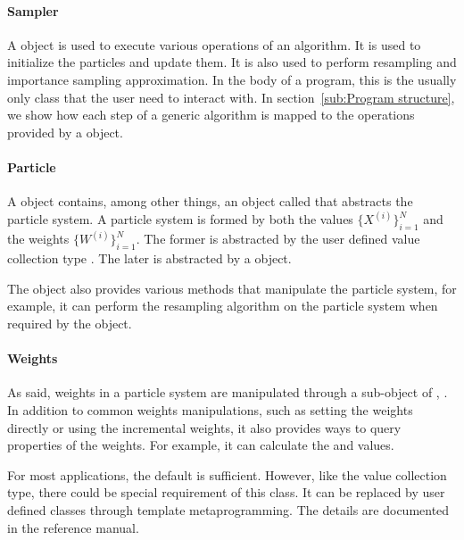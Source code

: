 \paragraph{Sampler}

A  object is used to execute various operations of an
\smc algorithm. It is used to initialize the particles and update them. It is
also used to perform resampling and importance sampling approximation. In the
body of a program, this is the usually only class that the user need to
interact with. In section~\ref{sub:Program structure}, we show how each step
of a generic \smc algorithm is mapped to the operations provided by a
 object.

\paragraph{Particle}

A  object contains, among other things, an object called
 that abstracts the particle system. A particle system
is formed by both the values $\{X^{(i)}\}_{i=1}^N$ and the weights
$\{W^{(i)}\}_{i=1}^N$. The former is abstracted by the user defined value
collection type . The later is abstracted by a
 object.

The  object also provides various methods that
manipulate the particle system, for example, it can perform the resampling
algorithm on the particle system when required by the 
object.

\paragraph{Weights}

As said, weights in a particle system are manipulated through a sub-object of
, . In addition to common
weights manipulations, such as setting the weights directly or using the
incremental weights, it also provides ways to query properties of the
weights. For example, it can calculate the \ess and \cess values.

For most applications, the default  is sufficient.
However, like the value collection type, there could be special requirement of
this class. It can be replaced by user defined classes through \cpp template
metaprogramming. The details are documented in the reference manual.

